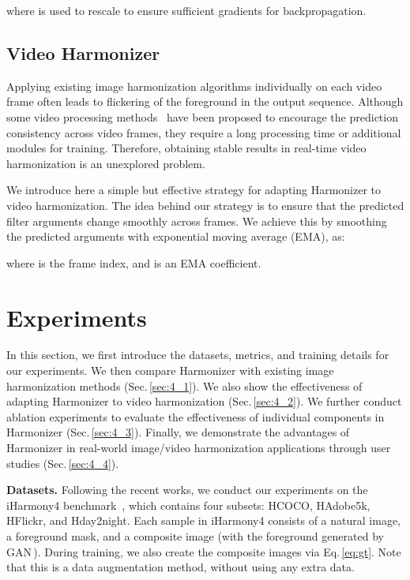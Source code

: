 \documentclass[runningheads]{llncs}
\newcommand{\ke}[1]{{\color{black}#1}}
\begin{document}
\ke{where  is used to rescale  to ensure sufficient gradients for backpropagation.}


\subsection{Video Harmonizer}\label{sec:video}

Applying existing image harmonization algorithms individually on each video frame often leads to flickering of the foreground in the output sequence. Although some video processing methods~\cite{bonneel2013examplebased,bonneel2015blind,Lai-ECCV-2018,lei2020dvp} have been proposed to encourage the prediction consistency across video frames, they require a long processing time or additional modules for training. 
Therefore, obtaining stable results in real-time video harmonization is an unexplored problem.

We introduce here a simple but effective strategy for adapting Harmonizer to video harmonization. The idea behind our strategy is to ensure that the predicted filter arguments change smoothly across frames. 
We achieve this by smoothing the predicted arguments  with exponential moving average (EMA), as:

where  is the frame index, and  is an EMA coefficient.


\section{Experiments}

In this section, we first introduce the datasets, metrics, and training details for our experiments. 
We then compare Harmonizer with existing image harmonization methods (Sec.\,\ref{sec:4_1}).
We also show the effectiveness of adapting Harmonizer to video harmonization (Sec.\,\ref{sec:4_2}). 
We further conduct ablation experiments to evaluate the effectiveness of individual components in Harmonizer (Sec.\,\ref{sec:4_3}). 
Finally, we demonstrate the advantages of Harmonizer in real-world image/video harmonization applications through user studies (Sec.\,\ref{sec:4_4}).

\textbf{Datasets.} Following the recent works, we conduct our experiments on the iHarmony4 benchmark~\cite{DoveNet}, which contains four subsets: HCOCO, HAdobe5k, HFlickr, and Hday2night. Each sample in iHarmony4 consists of a natural image, a foreground mask, and a composite image (with the foreground generated by GAN\,\cite{GAN}). During training, we also create the composite images via Eq.\,\ref{eq:gt}. Note that this is a data augmentation method, without using any extra data. 
\end{document}
